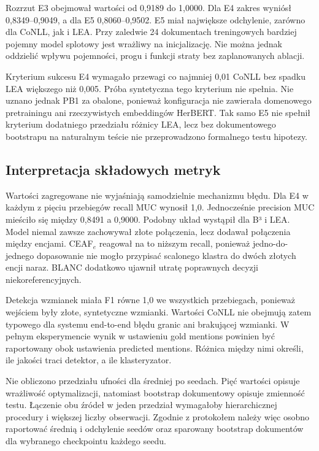 Rozrzut E3 obejmował wartości od 0,9189 do 1,0000. Dla E4 zakres wyniósł 0,8349--0,9049, a dla E5 0,8060--0,9502. E5 miał największe odchylenie, zarówno dla CoNLL, jak i LEA. Przy zaledwie 24 dokumentach treningowych bardziej pojemny model splotowy jest wrażliwy na inicjalizację. Nie można jednak oddzielić wpływu pojemności, progu i funkcji straty bez zaplanowanych ablacji.

Kryterium sukcesu E4 wymagało przewagi co najmniej 0,01 CoNLL bez spadku LEA większego niż 0,005. Próba syntetyczna tego kryterium nie spełnia. Nie uznano jednak PB1 za obalone, ponieważ konfiguracja nie zawierała domenowego pretrainingu ani rzeczywistych embeddingów HerBERT. Tak samo E5 nie spełnił kryterium dodatniego przedziału różnicy LEA, lecz bez dokumentowego bootstrapu na naturalnym teście nie przeprowadzono formalnego testu hipotezy.

\subsection{Interpretacja składowych metryk}

Wartości zagregowane nie wyjaśniają samodzielnie mechanizmu błędu. Dla E4 w każdym z pięciu przebiegów recall MUC wynosił 1,0. Jednocześnie precision MUC mieściło się między 0,8491 a 0,9000. Podobny układ wystąpił dla B³ i LEA. Model niemal zawsze zachowywał złote połączenia, lecz dodawał połączenia między encjami. CEAF$_e$ reagował na to niższym recall, ponieważ jedno-do-jednego dopasowanie nie mogło przypisać scalonego klastra do dwóch złotych encji naraz. BLANC dodatkowo ujawnił utratę poprawnych decyzji niekoreferencyjnych.

Detekcja wzmianek miała F1 równe 1,0 we wszystkich przebiegach, ponieważ wejściem były złote, syntetyczne wzmianki. Wartości CoNLL nie obejmują zatem typowego dla systemu end-to-end błędu granic ani brakującej wzmianki. W pełnym eksperymencie wynik w ustawieniu gold mentions powinien być raportowany obok ustawienia predicted mentions. Różnica między nimi określi, ile jakości traci detektor, a ile klasteryzator.

Nie obliczono przedziału ufności dla średniej po seedach. Pięć wartości opisuje wrażliwość optymalizacji, natomiast bootstrap dokumentowy opisuje zmienność testu. Łączenie obu źródeł w jeden przedział wymagałoby hierarchicznej procedury i większej liczby obserwacji. Zgodnie z protokołem należy więc osobno raportować średnią i odchylenie seedów oraz sparowany bootstrap dokumentów dla wybranego checkpointu każdego seedu.

